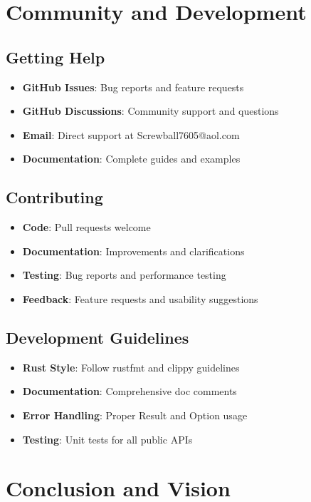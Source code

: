 \documentclass[12pt,a4paper]{article}
\makeatletter
\newcommand{\email}{Screwball7605@aol.com}
\makeatother
\begin{document}
\section{Community and Development}

\subsection{Getting Help}
\begin{itemize}
    \item \textbf{GitHub Issues}: Bug reports and feature requests
    \item \textbf{GitHub Discussions}: Community support and questions
    \item \textbf{Email}: Direct support at \email
    \item \textbf{Documentation}: Complete guides and examples
\end{itemize}

\subsection{Contributing}
\begin{itemize}
    \item \textbf{Code}: Pull requests welcome
    \item \textbf{Documentation}: Improvements and clarifications
    \item \textbf{Testing}: Bug reports and performance testing
    \item \textbf{Feedback}: Feature requests and usability suggestions
\end{itemize}

\subsection{Development Guidelines}
\begin{itemize}
    \item \textbf{Rust Style}: Follow rustfmt and clippy guidelines
    \item \textbf{Documentation}: Comprehensive doc comments
    \item \textbf{Error Handling}: Proper Result and Option usage
    \item \textbf{Testing}: Unit tests for all public APIs
\end{itemize}

\newpage

\section{Conclusion and Vision}
\end{document}
